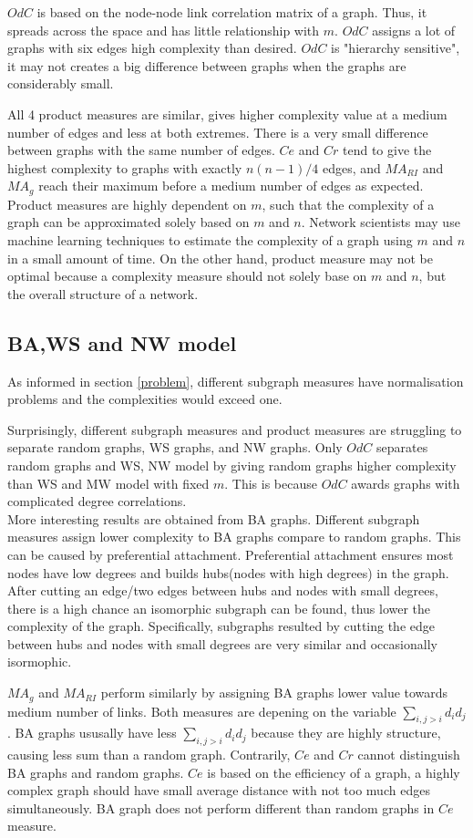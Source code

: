 \documentclass[12pt]{article}
\begin{document}
$OdC$ is based on the node-node link correlation matrix of a graph.\cite{odc} Thus, it spreads across the space and has little relationship with $m$. $OdC$ assigns a lot of graphs with six edges high complexity than desired. $OdC$ is "hierarchy sensitive", it may not creates a big difference between graphs when the graphs are considerably small.\par

All 4 product measures are similar, gives higher complexity value at a medium number of edges and less at both extremes. There is a very small difference between graphs with the same number of edges. $Ce$ and $Cr$ tend to give the highest complexity to graphs with exactly $n(n-1)/4$ edges, and $MA_{RI}$ and $MA_{g}$ reach their maximum before a medium number of edges as expected. Product measures are highly dependent on $m$, such that the complexity of a graph can be approximated solely based on $m$ and $n$. Network scientists may use machine learning techniques to estimate the complexity of a graph using $m$ and $n$ in a small amount of time. On the other hand, product measure may not be optimal because a complexity measure should not solely base on $m$ and $n$, but the overall structure of a network.


\subsection{BA,WS and NW model}
As informed in section \ref{problem}, different subgraph measures have normalisation problems and the complexities would exceed one.\par
Surprisingly, different subgraph measures and product measures are struggling to separate random graphs, WS graphs, and NW graphs. Only $OdC$ separates random graphs and WS, NW model by giving random graphs higher complexity than WS and MW model with fixed $m$. This is because $OdC$ awards graphs with complicated degree correlations.\\
More interesting results are obtained from BA graphs. Different subgraph measures assign lower complexity to BA graphs compare to random graphs. This can be caused by preferential attachment. Preferential attachment ensures most nodes have low degrees and builds hubs(nodes with high degrees) in the graph. After cutting an edge/two edges between hubs and nodes with small degrees, there is a high chance an isomorphic subgraph can be found, thus lower the complexity of the graph. Specifically, subgraphs resulted by cutting the edge between hubs and nodes with small degrees are very similar and occasionally isormophic.\par
$MA_g$ and $MA_{RI}$ perform similarly by assigning BA graphs lower value towards medium number of links. Both measures are depening on the variable $\sum_{i,j>i}d_id_j$. BA graphs ususally have less $\sum_{i,j>i}d_id_j$ because they are highly structure, causing less sum than a random graph. Contrarily, $Ce$ and $Cr$ cannot distinguish BA graphs and random graphs. $Ce$ is based on the efficiency of a graph, a highly complex graph should have small average distance with not too much edges simultaneously. BA graph does not perform different than random graphs in $Ce$ measure.\\
\end{document}
